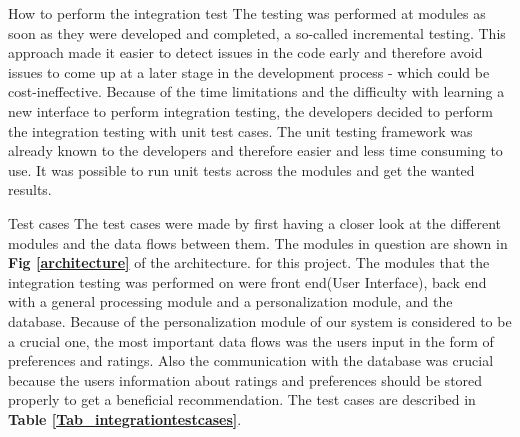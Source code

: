 How to perform the integration test\newline
The testing was performed at modules as soon as they were developed and completed, a so-called incremental testing. This approach made it easier to detect issues in the code early and therefore avoid issues to come up at a later stage in the development process - which could be cost-ineffective.
Because of the time limitations and the difficulty with learning a new interface to perform integration testing, the developers decided to perform the integration testing with unit test cases. The unit testing framework was already known to the developers and therefore easier and less time consuming to use. It was possible to run unit tests across the modules and get the wanted results.\newline

Test cases\newline 
The test cases were made by first having a closer look at the different modules and the data flows between them. The modules in question are shown in \textbf{Fig \ref{architecture}} of the architecture. for this project. The modules that the integration testing was performed on were front end(User Interface), back end with a general processing module and a personalization module, and the database. Because of the personalization module of our system is considered to be a crucial one, the most important data flows was the users input in the form of preferences and ratings. Also the communication with the database was crucial because the users information about ratings and preferences should be stored properly to get a beneficial recommendation. The test cases are described in \textbf{Table \ref{Tab_integrationtestcases}}.

